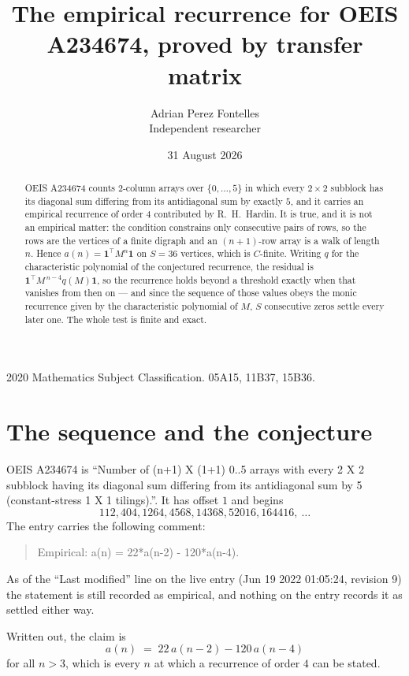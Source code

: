 \documentclass[11pt,a4paper]{article}
\title{The empirical recurrence for OEIS A234674, proved by transfer matrix}
\author{Adrian Perez Fontelles\\ \small Independent researcher}
\date{31 August 2026}
\theoremstyle{plain}
\theoremstyle{definition}
\begin{document}
\maketitle

\begin{abstract}
OEIS A234674 counts $2$-column arrays over $\{0,\dots,5\}$ in which every
$2\times2$ subblock has its diagonal sum differing from its antidiagonal sum by
exactly $5$, and it
carries an empirical recurrence of order $4$ contributed by R.~H.~Hardin. It is true,
and it is not an empirical matter: the condition constrains only consecutive pairs of rows,
so the rows are the vertices of a finite digraph and an $(n+1)$-row array is a walk of
length $n$. Hence $a(n)=\mathbf{1}^{\!\top}M^{n}\mathbf{1}$ on $S=36$ vertices, which
is $C$-finite. Writing $q$ for the characteristic polynomial of the conjectured recurrence,
the residual is $\mathbf{1}^{\!\top}M^{\,n-4}q(M)\mathbf{1}$, so the recurrence
holds beyond a threshold exactly when that vanishes from then on --- and since the sequence
of those values obeys the monic recurrence given by the characteristic polynomial of $M$,
$S$ consecutive zeros settle every later one. The whole test is finite and exact.
\end{abstract}

\noindent\small 2020 Mathematics Subject Classification. 05A15, 11B37, 15B36.\normalsize

\section{The sequence and the conjecture}

OEIS A234674 is ``Number of (n+1) X (1+1) 0..5 arrays with every 2 X 2 subblock having its diagonal sum differing from its antidiagonal sum by 5 (constant-stress 1 X 1 tilings).''. It has offset
$1$ and begins
\[
112, 404, 1264, 4568, 14368, 52016, 164416,\ \dots
\]
The entry carries the following comment:
\begin{quote}\small
Empirical: a(n) = 22*a(n-2) - 120*a(n-4).
\end{quote}
As of the ``Last modified'' line on the live entry (Jun 19 2022 01:05:24, revision 9) the statement is
still recorded as empirical, and nothing on the entry records it as settled either way.

Written out, the claim is
\begin{equation}\label{eq:conj}
a(n)\;=\;22\,a(n-2) - 120\,a(n-4)
\end{equation}
for all $n>3$, which is every $n$ at which a recurrence of order $4$ can be
stated.
\end{document}
